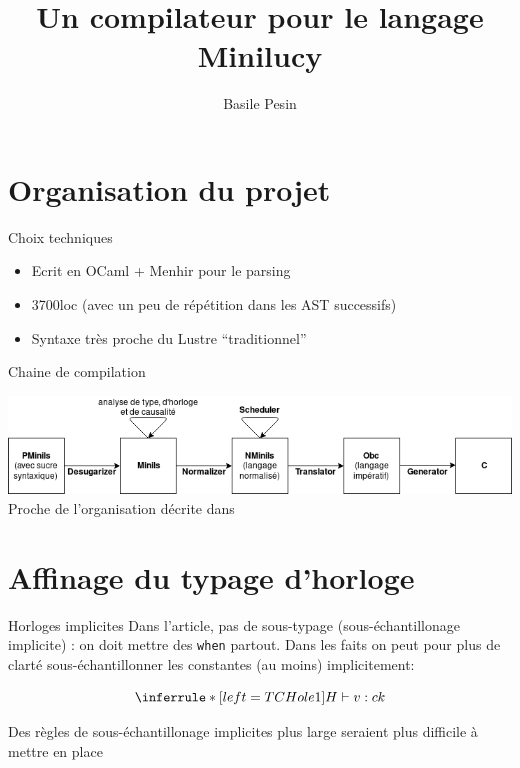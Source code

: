 \documentclass[xcolor={svgnames}]{beamer}
\title{Un compilateur pour le langage Minilucy}
\author{Basile Pesin}
\begin{document}
\maketitle

\section{Organisation du projet}

\begin{frame}{Choix techniques}
  \begin{itemize}
    \item Ecrit en OCaml + Menhir pour le parsing
    \item 3700loc (avec un peu de répétition dans les AST successifs)
    \item Syntaxe très proche du Lustre ``traditionnel''
  \end{itemize}
\end{frame}

\begin{frame}{Chaine de compilation}
  \begin{center}
    \includegraphics[width=.8\paperwidth]{assets/chain.png}
    Proche de l'organisation décrite dans~\citep{Biernacki08}
  \end{center}
\end{frame}

\section{Affinage du typage d'horloge}

\begin{frame}{Horloges implicites}
  Dans l'article, pas de sous-typage (sous-échantillonage implicite) : on doit mettre des \lstinline{when} partout. Dans les faits on peut pour plus de clarté sous-échantillonner les constantes (au moins) implicitement:

$$\inferrule* [left=TCHole1]
    { }
    { H \vdash v : ck }
$$

Des règles de sous-échantillonage implicites plus large seraient plus difficile à mettre en place
\end{frame}
\end{document}

